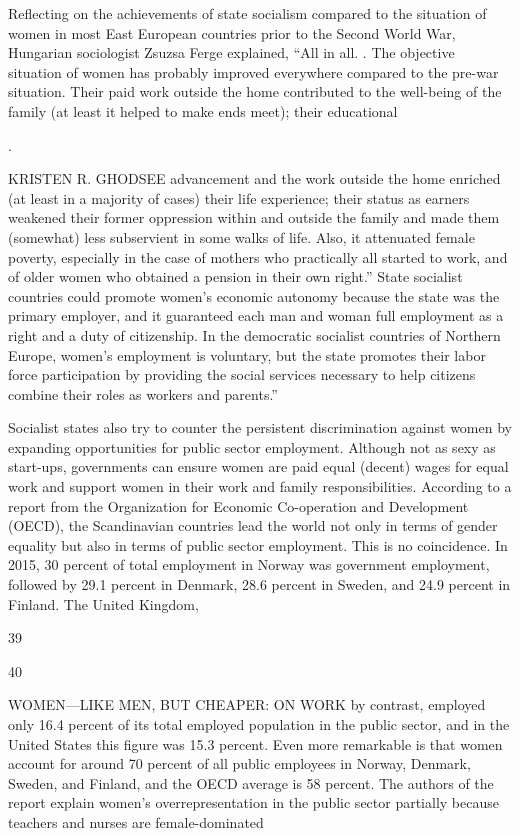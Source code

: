 \par 
Reflecting on the achievements of state socialism compared to the situation of women in most East European countries prior to the Second World War, Hungarian sociologist Zsuzsa Ferge explained, “All in all. . The objective situation of women has probably improved everywhere compared to the pre-war situation. Their paid work outside the home contributed to the well-being of the family (at least it helped to make ends meet); their educational
 \par 
.
 \par 
KRISTEN R. GHODSEE advancement and the work outside the home enriched (at least in a majority of cases) their life experience; their status as earners weakened their former oppression within and outside the family and made them (somewhat) less subservient in some walks of life. Also, it attenuated female poverty, especially in the case of mothers who practically all started to work, and of older women who obtained a pension in their own right.” State socialist countries could promote women’s economic autonomy because the state was the primary employer, and it guaranteed each man and woman full employment as a right and a duty of citizenship. In the democratic socialist countries of Northern Europe, women’s employment is voluntary, but the state promotes their labor force participation by providing the social services necessary to help citizens combine their roles as workers and parents.”
 \par 
Socialist states also try to counter the persistent discrimination against women by expanding opportunities for public sector employment. Although not as sexy as start-ups, governments can ensure women are paid equal (decent) wages for equal work and support women in their work and family responsibilities. According to a report from the Organization for Economic Co-operation and Development (OECD), the Scandinavian countries lead the world not only in terms of gender equality but also in terms of public sector employment. This is no coincidence. In 2015, {\color{blue}30} percent of total employment in Norway was government employment, followed by {\color{blue}29}.{\color{blue}1} percent in Denmark, {\color{blue}28}.{\color{blue}6} percent in Sweden, and {\color{blue}24}.{\color{blue}9} percent in Finland. The United Kingdom,
 \par 
39
 \par 
40
 \par 
WOMEN—LIKE MEN, BUT CHEAPER: ON WORK by contrast, employed only {\color{blue}16}.{\color{blue}4} percent of its total employed population in the public sector, and in the United States this figure was {\color{blue}15}.{\color{blue}3} percent. Even more remarkable is that women account for around {\color{blue}70} percent of all public employees in Norway, Denmark, Sweden, and Finland, and the OECD average is {\color{blue}58} percent. The authors of the report explain women’s overrepresentation in the public sector partially because teachers and nurses are female-dominated
